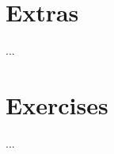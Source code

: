 \documentclass[11pt,english]{article}
\begin{document}




\newpage
\section*{Extras}
...


\newpage
\pagestyle{fancy}

\section*{Exercises}
...
\end{document}
